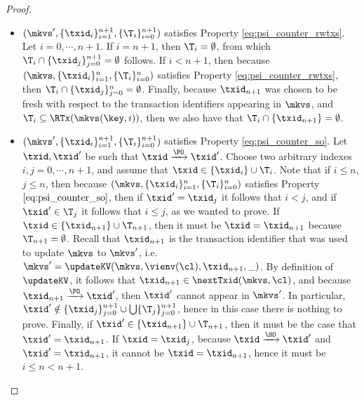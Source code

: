 \begin{proof}
\begin{itemize}
\begin{itemize}
\item $(\mkvs', \{\txid_{i}\}_{i=1}^{n+1}, \{\T_{i}\}_{i=0}^{n+1})$ 
satisfies Property \eqref{eq:psi_counter_rwtxs}. Let $i =0, \cdots, n+1$. If $i = n+1$, then 
$\T_{i} = \emptyset$, from which $\T_{i} \cap \{\txid_{j}\}_{j=0}^{n+1} = \emptyset$ follows. If $i < n+1$, then 
because $(\mkvs, \{\txid_{i}\}_{i=1}^{n}, \{\T_{i}\}_{i=0}^{n})$ 
satisfies Property \eqref{eq:psi_counter_rwtxs}, then $\T_{i} \cap \{\txid_{j}\}_{j=0}^{n} = \emptyset$. 
Finally, because $\txid_{n+1}$ was chosen to be fresh with respect to the transaction identifiers appearing in 
$\mkvs$, and $\T_{i} \subseteq \RTx(\mkvs(\key, i))$, then  we also have that $\T_{i} \cap \{\txid_{n+1}\} = \emptyset$. 
\item $(\mkvs', \{\txid_{i}\}_{i=1}^{n+1}, \{\T_{i}\}_{i=0}^{n+1})$ satisfies Property \eqref{eq:psi_counter_so}. Let 
$\txid, \txid'$ be such that $\txid \xrightarrow{\PO} \txid'$. Choose two arbitrary indexes $i,j=0,\cdots, n+1$, 
and assume that $\txid \in \{\txid_{i}\} \cup \T_{i}$. Note that if $i \leq n$, $j \leq n$, then 
because $(\mkvs, \{\txid_{i}\}_{i=1}^{n}, \{\T_{i}\}_{i=0}^{n})$ satisfies Property $\eqref{eq:psi_counter_so}$, then 
if $\txid' = \txid_{j}$ it follows that $i < j$, and if $\txid' \in \T_{j}$ it follows that $i \leq j$, as 
we wanted to prove. 
If $\txid \in \{\txid_{n+1}\} \cup \T_{n+1}$, then it must be $\txid = \txid_{n+1}$ because 
$\T_{n+1} = \emptyset$. Recall that $\txid_{n+1}$ is the transaction identifier that was used 
to update $\mkvs$ to $\mkvs'$, i.e. $\mkvs' = \updateKV(\mkvs, \vienv(\cl), \txid_{n+1}, \_)$. By 
definition of $\updateKV$, it follows that $\txid_{n+1} \in \nextTxid(\mkvs, \cl)$, 
and because $\txid_{n+1} \xrightarrow{\PO} \txid'$, then $\txid'$ cannot appear in $\mkvs'$. 
In particular, 
$\txid' \notin \{\txid_{j}\}_{j=0}^{n+1} \cup \bigcup \{\T_{j}\}_{j=0}^{n+1}$, hence in this case there is nothing to prove. 
Finally, if $\txid' \in \{\txid_{n+1}\} \cup \T_{n+1}$, then 
it must be the case that $\txid' = \txid_{n+1}$. If $\txid = \txid_{j}$, because 
$\txid \xrightarrow{\SO} \txid'$ and $\txid' = \txid_{n+1}$, it cannot be $\txid = \txid_{n+1}$, 
hence it must be $i \leq n < n+1$. 

\end{itemize}
\end{itemize}
\end{proof}
